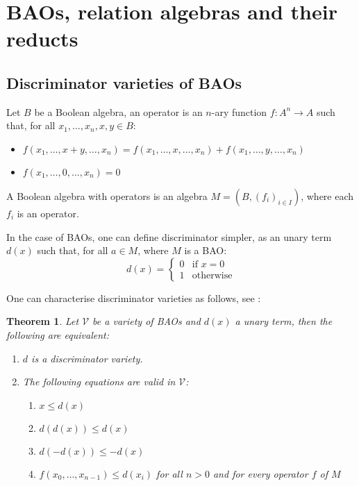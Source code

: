 \documentclass[a4paper]{article}
\theoremstyle{defin}
\theoremstyle{theorem}
\newtheorem{theorem}{Theorem}
\theoremstyle{claim}
\theoremstyle{prop}
\theoremstyle{lemma}
\theoremstyle{fact}
\theoremstyle{ex}
\theoremstyle{col}
\begin{document}
\section{BAOs, relation algebras and their reducts}

\subsection{Discriminator varieties of BAOs}

Let $B$ be a Boolean algebra, an operator is an $n$-ary function $f : A^n \to A$ such that, for all $x_1, \dots, x_n, x, y \in B$:

\begin{itemize}
\item $f(x_1, \dots, x + y, \dots, x_n) = f(x_1, \dots, x, \dots, x_n) + f(x_1, \dots, y, \dots, x_n)$
\item $f(x_1, \dots, 0, \dots, x_n) = 0$
\end{itemize}

A Boolean algebra with operators is an algebra $M = (B, (f_i)_{i \in I})$, where each $f_i$ is an operator.

In the case of BAOs, one can define discriminator simpler, as an unary term $d(x)$ such that, for all $a \in M$, where $M$ is a BAO:
\begin{equation}
d(x) =
\begin{cases}
  0 & \text{if $x = 0$} \\
  1 & \text{otherwise}
\end{cases}
\end{equation}

One can characterise discriminator varieties as follows, see \cite[Lemma 2.1]{andreka1998notions}:
\begin{theorem} Let $\mathcal{V}$ be a variety of BAOs and $d(x)$ a unary term, then the following are equivalent:

\begin{enumerate}
\item $d$ is a discriminator variety.
\item The following equations are valid in $\mathcal{V}$:
\begin{enumerate}
\item $x \leq d(x)$
\item $d(d(x)) \leq d(x)$
\item $d(- d(x)) \leq - d(x)$
\item $f(x_0, \dots, x_{n-1}) \leq d(x_i)$ for all $n > 0$ and for every operator $f$ of $M$
\end{enumerate}
\end{enumerate}
\end{theorem}
\end{document}
